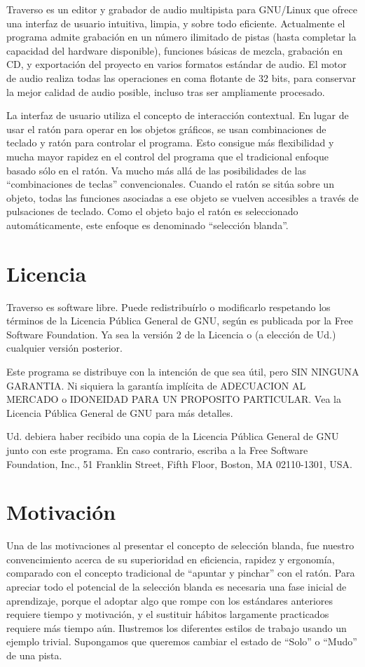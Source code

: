 ﻿Traverso es un editor y grabador de audio multipista para GNU/Linux que ofrece una interfaz de usuario intuitiva, limpia, y sobre todo eficiente. Actualmente el programa admite grabación en un número ilimitado de pistas (hasta completar la capacidad del hardware disponible), funciones básicas de mezcla, grabación en CD, y exportación del proyecto en varios formatos estándar de audio. El motor de audio realiza todas las operaciones en coma flotante de 32 bits, para conservar la mejor calidad de audio posible, incluso tras ser ampliamente procesado.  

La interfaz de usuario utiliza el concepto de interacción contextual. En lugar de usar el ratón para operar en los objetos gráficos, se usan combinaciones de teclado y ratón para controlar el programa. Esto consigue más flexibilidad y mucha mayor rapidez en el control del programa que el tradicional enfoque basado sólo en el ratón. Va mucho más allá de las posibilidades de las ``combinaciones de teclas'' convencionales. Cuando el ratón se sitúa sobre un objeto, todas las funciones asociadas a ese objeto se vuelven accesibles a través de pulsaciones de teclado. Como el objeto bajo el ratón es seleccionado automáticamente, este enfoque es denominado ``selección blanda''.

\section{Licencia}
Traverso es software libre. Puede redistribuírlo o modificarlo respetando los términos de la Licencia Pública General de GNU, según es publicada por la Free Software Foundation. Ya sea la versión 2 de la Licencia o (a elección de Ud.) cualquier versión posterior.

Este programa se distribuye con la intención de que sea útil, pero SIN NINGUNA GARANTIA. Ni siquiera la garantía implícita de ADECUACION AL MERCADO o IDONEIDAD PARA UN PROPOSITO PARTICULAR. Vea la Licencia Pública General de GNU para más detalles.

Ud. debiera haber recibido una copia de la Licencia Pública General de GNU junto con este programa. En caso contrario, escriba a la Free Software Foundation, Inc., 51 Franklin Street, Fifth Floor, Boston, MA  02110-1301, USA.

\section{Motivación}
Una de las motivaciones al presentar el concepto de selección blanda, fue nuestro convencimiento acerca de su superioridad en eficiencia, rapidez y ergonomía, comparado con el concepto tradicional de ``apuntar y pinchar'' con el ratón. Para apreciar todo el potencial de la selección blanda es necesaria una fase inicial de aprendizaje, porque el adoptar algo que rompe con los estándares anteriores requiere tiempo y motivación, y el sustituir hábitos largamente practicados requiere más tiempo aún. Ilustremos los diferentes estilos de trabajo usando un ejemplo trivial. Supongamos que queremos cambiar el estado de ``Solo'' o ``Mudo'' de una pista.

